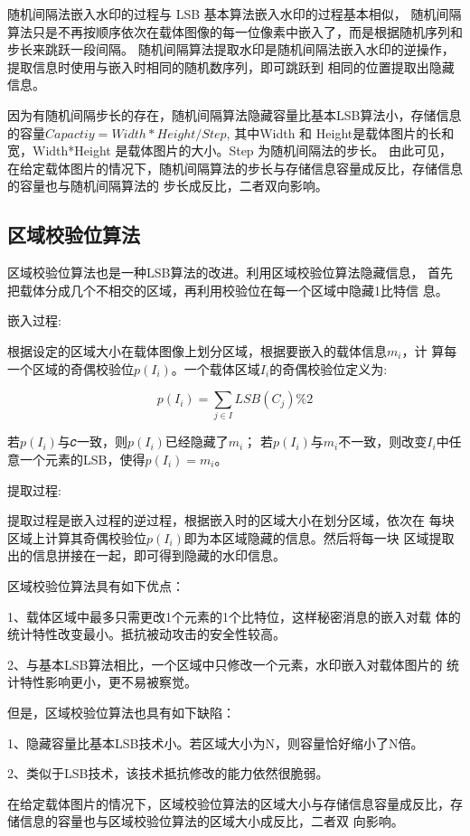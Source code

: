 \documentclass[a4paper,zihao=5,UTF8]{ctexart}
\begin{document}
随机间隔法嵌入水印的过程与 LSB 基本算法嵌入水印的过程基本相似，
随机间隔算法只是不再按顺序依次在载体图像的每一位像素中嵌入了，而是根据随机序列和步长来跳跃一段间隔。
随机间隔算法提取水印是随机间隔法嵌入水印的逆操作，提取信息时使用与嵌入时相同的随机数序列，即可跳跃到
相同的位置提取出隐藏信息。

因为有随机间隔步长的存在，随机间隔算法隐藏容量比基本LSB算法小，存储信息的容量$Capactiy=Width*Height/Step$,
其中Width 和 Height是载体图片的长和宽，Width*Height 是载体图片的大小。Step 为随机间隔法的步长。
由此可见，在给定载体图片的情况下，随机间隔算法的步长与存储信息容量成反比，存储信息的容量也与随机间隔算法的
步长成反比，二者双向影响。

\subsection{区域校验位算法}

区域校验位算法也是一种LSB算法的改进。利用区域校验位算法隐藏信息，
首先把载体分成几个不相交的区域，再利用校验位在每一个区域中隐藏1比特信
息。

嵌入过程:

    根据设定的区域大小在载体图像上划分区域，根据要嵌入的载体信息$m_i$，计
算每一个区域的奇偶校验位$p(I_i)$。一个载体区域$I_i$的奇偶校验位定义为:

$$
p(I_i) = \sum_{j \in I} LSB(C_j) \% 2
$$

    若$p(I_i)$与𝑐一致，则$p(I_i)$已经隐藏了$m_i$；
    若$p(I_i)$与$m_i$不一致，则改变$I_i$中任意一个元素的LSB，使得$p(I_i) = m_i$。

提取过程:

提取过程是嵌入过程的逆过程，根据嵌入时的区域大小在划分区域，依次在
每块区域上计算其奇偶校验位$p(I_i)$即为本区域隐藏的信息。然后将每一块
区域提取出的信息拼接在一起，即可得到隐藏的水印信息。

区域校验位算法具有如下优点：

1、载体区域中最多只需更改1个元素的1个比特位，这样秘密消息的嵌入对载
体的统计特性改变最小。抵抗被动攻击的安全性较高。

2、与基本LSB算法相比，一个区域中只修改一个元素，水印嵌入对载体图片的
统计特性影响更小，更不易被察觉。

但是，区域校验位算法也具有如下缺陷：

1、隐藏容量比基本LSB技术小。若区域大小为N，则容量恰好缩小了N倍。

2、类似于LSB技术，该技术抵抗修改的能力依然很脆弱。

在给定载体图片的情况下，区域校验位算法的区域大小与存储信息容量成反比，存储信息的容量也与区域校验位算法的区域大小成反比，二者双
向影响。
\end{document}
